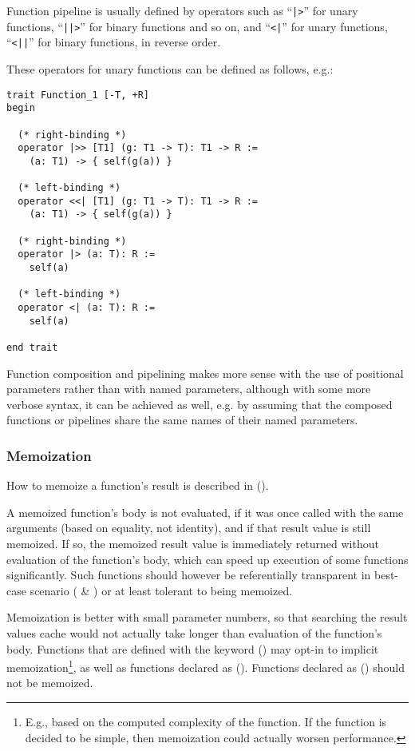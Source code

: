 Function pipeline is usually defined by operators such as ``\lstinline!|>!'' for unary functions, ``\lstinline!||>!'' for binary functions and so on, and ``\lstinline!<|!'' for unary functions, ``\lstinline!<||!'' for binary functions, in reverse order. 

These operators for unary functions can be defined as follows, e.g.:
\begin{lstlisting}
trait Function_1 [-T, +R]
begin

  (* right-binding *)
  operator |>> [T1] (g: T1 -> T): T1 -> R := 
    (a: T1) -> { self(g(a)) }

  (* left-binding *)
  operator <<| [T1] (g: T1 -> T): T1 -> R :=
    (a: T1) -> { self(g(a)) }

  (* right-binding *)
  operator |> (a: T): R :=
    self(a)

  (* left-binding *)
  operator <| (a: T): R := 
    self(a)
    
end trait
\end{lstlisting}

Function composition and pipelining makes more sense with the use of positional parameters rather than with named parameters, although with some more verbose syntax, it can be achieved as well, e.g. by assuming that the composed functions or pipelines share the same names of their named parameters. 





\subsubsection{Memoization}
\label{sec:memoization}

How to memoize a function's result is described in ().

A memoized function's body is not evaluated, if it was once called with the same arguments (based on equality, not identity), and if that result value is still memoized. If so, the memoized result value is immediately returned without evaluation of the function's body, which can speed up execution of some functions significantly. Such functions should however be referentially transparent in best-case scenario ( \& ) or at least tolerant to being memoized. 

Memoization is better with small parameter numbers, so that searching the result values cache would not actually take longer than evaluation of the function's body. Functions that are defined with the  keyword () may opt-in to implicit memoization\footnote{E.g., based on the computed complexity of the function. If the function is decided to be simple, then memoization could actually worsen performance.}, as well as functions declared as  (). Functions declared as  () should not be memoized. 

